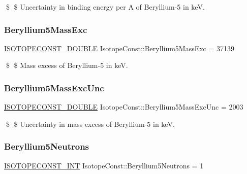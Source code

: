 \$ \$ Uncertainty in binding energy per A of Beryllium-\/5 in keV. \mbox{\label{group___isotope_const-_beryllium-_be5_ga06f58273efc624187051d003f773e8f7}} 
\subsubsection{\texorpdfstring{Beryllium5\+Mass\+Exc}{Beryllium5MassExc}}
{\footnotesize\ttfamily \mbox{\hyperlink{group___isotope_const-_macros_ga8f45a7272ce02c0b4c65c44636ed719a}{I\+S\+O\+T\+O\+P\+E\+C\+O\+N\+S\+T\+\_\+\+D\+O\+U\+B\+LE}} Isotope\+Const\+::\+Beryllium5\+Mass\+Exc = 37139}

\$ \$ Mass excess of Beryllium-\/5 in keV. \mbox{\label{group___isotope_const-_beryllium-_be5_ga226d2bb5a09cac0335111d962e026a82}} 
\subsubsection{\texorpdfstring{Beryllium5\+Mass\+Exc\+Unc}{Beryllium5MassExcUnc}}
{\footnotesize\ttfamily \mbox{\hyperlink{group___isotope_const-_macros_ga8f45a7272ce02c0b4c65c44636ed719a}{I\+S\+O\+T\+O\+P\+E\+C\+O\+N\+S\+T\+\_\+\+D\+O\+U\+B\+LE}} Isotope\+Const\+::\+Beryllium5\+Mass\+Exc\+Unc = 2003}

\$ \$ Uncertainty in mass excess of Beryllium-\/5 in keV. \mbox{\label{group___isotope_const-_beryllium-_be5_ga43400ac0a7615de178a2188fb198ef39}} 
\subsubsection{\texorpdfstring{Beryllium5\+Neutrons}{Beryllium5Neutrons}}
{\footnotesize\ttfamily \mbox{\hyperlink{group___isotope_const-_macros_ga5f18360b3e99483a35c32d789e62621c}{I\+S\+O\+T\+O\+P\+E\+C\+O\+N\+S\+T\+\_\+\+I\+NT}} Isotope\+Const\+::\+Beryllium5\+Neutrons = 1}

